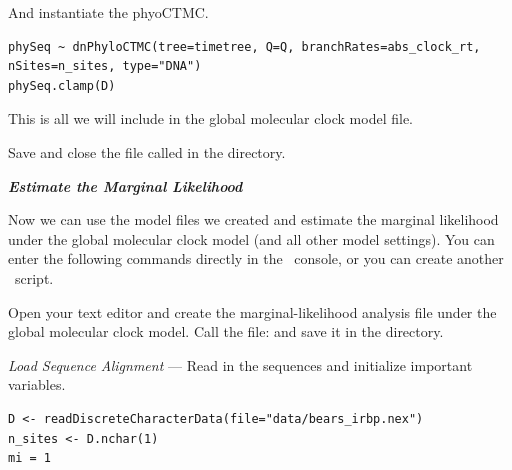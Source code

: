And instantiate the phyoCTMC.
{\tt \begin{snugshade*}
\begin{lstlisting}
phySeq ~ dnPhyloCTMC(tree=timetree, Q=Q, branchRates=abs_clock_rt, nSites=n_sites, type="DNA")
phySeq.clamp(D)
\end{lstlisting}
\end{snugshade*}}

This is all we will include in the global molecular clock model file. 

{\begin{framed}
Save and close the file called {\textcolor{red}{}} in the  directory.
\end{framed}}



%

\textbf{\textit{Estimate the Marginal Likelihood}}

Now we can use the model files we created and estimate the marginal likelihood under the global molecular clock model (and all other model settings). 
You can enter the following commands directly in the \RevBayes~console, or you can create another \Rev~script. 

{\begin{framed}
Open your text editor and create the marginal-likelihood analysis file under the global molecular clock model. Call the file: {\textcolor{red}{}} and save it in the  directory.
\end{framed}}


\textit{Load Sequence Alignment} --- Read in the sequences and initialize important variables.
{\tt \begin{snugshade*}
\begin{lstlisting}
D <- readDiscreteCharacterData(file="data/bears_irbp.nex")
n_sites <- D.nchar(1)
mi = 1
\end{lstlisting}
\end{snugshade*}}

